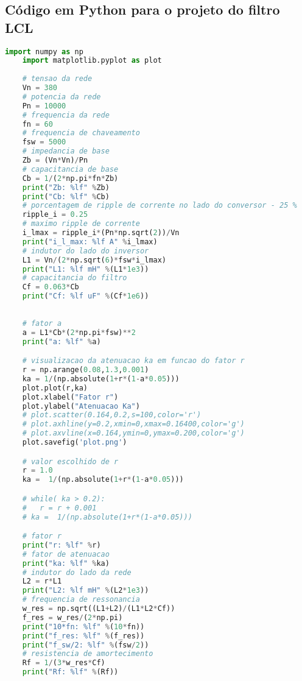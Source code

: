 \begin{anexosenv}

\partanexos

\chapter{Código em Python para o projeto do filtro LCL}\label{codigo-python-filtro}

\begin{lstlisting}[language=Python,caption=Projeto do filtro LCL e controladores]
    import numpy as np 
    import matplotlib.pyplot as plot
    
    # tensao da rede
    Vn = 380
    # potencia da rede
    Pn = 10000
    # frequencia da rede
    fn = 60
    # frequencia de chaveamento
    fsw = 5000
    # impedancia de base
    Zb = (Vn*Vn)/Pn
    # capacitancia de base
    Cb = 1/(2*np.pi*fn*Zb)
    print("Zb: %lf" %Zb)
    print("Cb: %lf" %Cb)
    # porcentagem de ripple de corrente no lado do conversor - 25 %
    ripple_i = 0.25
    # maximo ripple de corrente
    i_lmax = ripple_i*(Pn*np.sqrt(2))/Vn
    print("i_l_max: %lf A" %i_lmax)
    # indutor do lado do inversor
    L1 = Vn/(2*np.sqrt(6)*fsw*i_lmax)
    print("L1: %lf mH" %(L1*1e3))
    # capacitancia do filtro
    Cf = 0.063*Cb
    print("Cf: %lf uF" %(Cf*1e6))
    
    
    # fator a
    a = L1*Cb*(2*np.pi*fsw)**2
    print("a: %lf" %a)

    # visualizacao da atenuacao ka em funcao do fator r
    r = np.arange(0.08,1.3,0.001)
    ka = 1/(np.absolute(1+r*(1-a*0.05)))
    plot.plot(r,ka)
    plot.xlabel("Fator r")
    plot.ylabel("Atenuacao Ka")
    # plot.scatter(0.164,0.2,s=100,color='r')
    # plot.axhline(y=0.2,xmin=0,xmax=0.16400,color='g')
    # plot.axvline(x=0.164,ymin=0,ymax=0.200,color='g')
    plot.savefig('plot.png')

    # valor escolhido de r
    r = 1.0
    ka =  1/(np.absolute(1+r*(1-a*0.05)))

    # while( ka > 0.2):
    #   r = r + 0.001
    # ka =  1/(np.absolute(1+r*(1-a*0.05)))

    # fator r
    print("r: %lf" %r)
    # fator de atenuacao
    print("ka: %lf" %ka)
    # indutor do lado da rede
    L2 = r*L1
    print("L2: %lf mH" %(L2*1e3))
    # frequencia de ressonancia
    w_res = np.sqrt((L1+L2)/(L1*L2*Cf))
    f_res = w_res/(2*np.pi)
    print("10*fn: %lf" %(10*fn))
    print("f_res: %lf" %(f_res))
    print("f_sw/2: %lf" %(fsw/2))
    # resistencia de amortecimento
    Rf = 1/(3*w_res*Cf)
    print("Rf: %lf" %(Rf))


\end{lstlisting}
\end{anexosenv}

